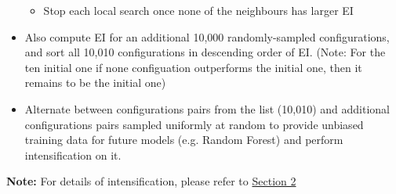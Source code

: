 \documentclass[10pt]{article}
\theoremstyle{definition}
\newcommand{\Note}[0]{\noindent\textbf{Note: }}
\begin{document}
\begin{itemize}
\begin{itemize}
        \item Stop each local search once none of the neighbours has larger EI
    \end{itemize}
    \item Also compute EI for an additional 10,000 randomly-sampled configurations, 
        and sort all 10,010 configurations in descending order of EI. (Note: For the ten initial one
        if none configuation outperforms the initial one, then it remains to be the initial one)
    \item Alternate between configurations pairs from the list (10,010) and additional configurations pairs sampled uniformly at random 
    to provide unbiased training data for future models (e.g. Random Forest) and perform intensification on it.
\end{itemize}
\Note For details of intensification, please refer to 
\hyperref[sec:ROAR]{Section 2}
\end{document}

